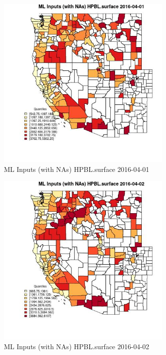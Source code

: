 \begin{figure} 
\centering  
\includegraphics[width=0.77\textwidth]{Code_Outputs/Report_ML_input_PM25_Step4_part_e_de_duplicated_aveswNAs_CountyHPBLsurfaceMean2016-04-01_2016-04-01.jpg} 
\caption{\label{fig:Report_ML_input_PM25_Step4_part_e_de_duplicated_aveswNAsCountyHPBLsurfaceMean2016-04-01_2016-04-01}ML Inputs (with NAs) HPBL.surface 2016-04-01} 
\end{figure} 
 

\begin{figure} 
\centering  
\includegraphics[width=0.77\textwidth]{Code_Outputs/Report_ML_input_PM25_Step4_part_e_de_duplicated_aveswNAs_CountyHPBLsurfaceMean2016-04-02_2016-04-02.jpg} 
\caption{\label{fig:Report_ML_input_PM25_Step4_part_e_de_duplicated_aveswNAsCountyHPBLsurfaceMean2016-04-02_2016-04-02}ML Inputs (with NAs) HPBL.surface 2016-04-02} 
\end{figure} 
 

